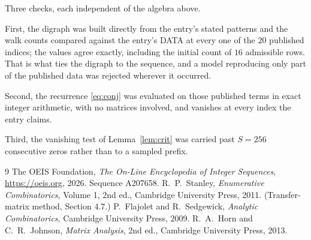 \documentclass[11pt,a4paper]{article}
\theoremstyle{plain}
\theoremstyle{definition}
\begin{document}
Three checks, each independent of the algebra above.

First, the digraph was built directly from the entry's stated patterns and the walk counts
compared against the entry's DATA at every one of the $20$ published indices; the
values agree exactly, including the initial count of $16$ admissible rows. That is
what ties the digraph to the sequence, and a model reproducing only part of the published
data was rejected wherever it occurred.

Second, the recurrence \eqref{eq:conj} was evaluated on those published terms in exact
integer arithmetic, with no matrices involved, and vanishes at every index the entry claims.

Third, the vanishing test of Lemma~\ref{lem:crit} was carried past $S=256$ consecutive
zeros rather than to a sampled prefix.

\begin{thebibliography}{9}
 The OEIS Foundation, \emph{The On-Line Encyclopedia of Integer
Sequences}, \url{https://oeis.org}, 2026. Sequence A207658.
 R.~P.~Stanley, \emph{Enumerative Combinatorics}, Volume 1, 2nd ed.,
Cambridge University Press, 2011. (Transfer-matrix method, Section 4.7.)
 P.~Flajolet and R.~Sedgewick, \emph{Analytic Combinatorics}, Cambridge
University Press, 2009.
 R.~A.~Horn and C.~R.~Johnson, \emph{Matrix Analysis}, 2nd ed., Cambridge
University Press, 2013.
\end{thebibliography}
\end{document}
